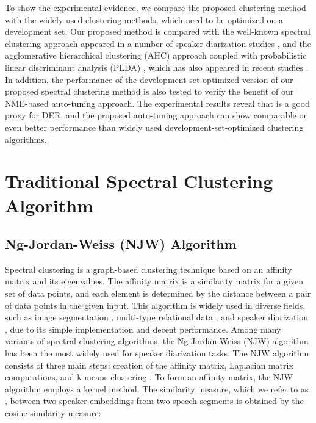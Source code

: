 \documentclass[journal]{IEEEtran}
\begin{document}
To show the experimental evidence, we compare the proposed clustering method with the widely used clustering methods, which need to be optimized on a development set. Our proposed method is compared with the well-known spectral clustering approach \cite{ng2002spectral} appeared in a number of speaker diarization studies \cite{ning2006spectral, shum2012use, luque2012}, and the agglomerative hierarchical clustering (AHC) approach coupled with probabilistic linear discriminant analysis (PLDA) \cite{ioffe2006probabilistic, prince2007probabilistic}, which has also appeared in recent studies \cite{garcia2017speaker, sell2018diarization, snyder_git}. In addition, the performance of the development-set-optimized version of our proposed spectral clustering method is also tested to verify the benefit of our NME-based auto-tuning approach. The experimental results reveal that  is a good proxy for DER, and the proposed auto-tuning approach can show comparable or even better performance than widely used development-set-optimized clustering algorithms.
\vspace{-1.0ex}
\section{Traditional Spectral Clustering Algorithm}
\subsection{Ng-Jordan-Weiss (NJW) Algorithm}
\label{spectral_clustering_framework}
Spectral clustering is a graph-based clustering technique based on an affinity matrix and its eigenvalues. The affinity matrix is a similarity matrix for a given set of data points, and each element is determined by the distance between a pair of data points in the given input. This algorithm is widely used in diverse fields, such as image segmentation \cite{zelnik2005self}, multi-type relational data \cite{long2006spectral}, and speaker diarization \cite{ning2006spectral, luque2012, shum2012use, shum2013unsupervised, wang2018speaker, qingjian2019}, due to its simple implementation and decent performance. Among many variants of spectral clustering algorithms, the Ng-Jordan-Weiss (NJW) algorithm \cite{ng2002spectral} has been the most widely used for speaker diarization tasks. The NJW algorithm consists of three main steps: creation of the affinity matrix, Laplacian matrix computations, and k-means clustering \cite{lloyd1982least}. To form an affinity matrix, the NJW algorithm employs a kernel method. The similarity measure, which we refer to as , between two speaker embeddings from two speech segments is obtained by the cosine similarity measure:
\end{document}
